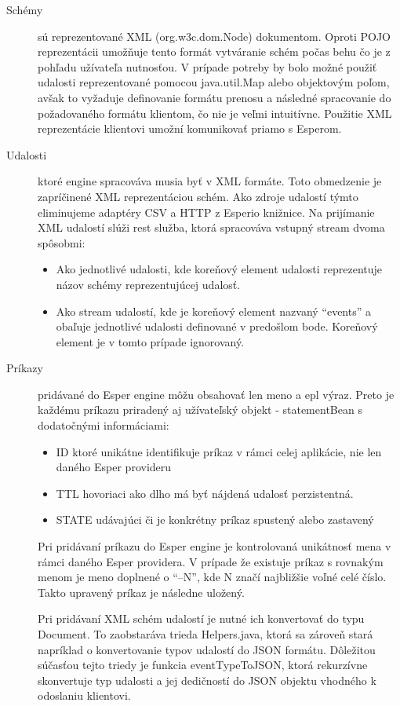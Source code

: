 		\begin{description}
			\item[Schémy] sú reprezentované XML (org.w3c.dom.Node) dokumentom. Oproti POJO reprezentácii umožňuje tento formát vytváranie schém počas behu čo je z pohľadu užívateľa nutnosťou. V prípade potreby by bolo možné použiť udalosti reprezentované pomocou java.util.Map alebo objektovým poľom, avšak to vyžaduje definovanie formátu prenosu a následné spracovanie do požadovaného formátu klientom, čo nie je veľmi intuitívne. Použitie XML reprezentácie klientovi umožní komunikovať priamo s Esperom.
			
			\item[Udalosti] ktoré engine spracováva musia byť v XML formáte. Toto obmedzenie je zapríčinené XML reprezentáciou schém. Ako zdroje udalostí týmto eliminujeme adaptéry CSV a HTTP z Esperio knižnice. Na prijímanie XML udalostí slúži rest služba, ktorá spracováva vstupný stream dvoma spôsobmi:
			\begin{itemize}
				\item Ako jednotlivé udalosti, kde koreňový element udalosti reprezentuje názov schémy reprezentujúcej udalosť.
				\item Ako stream udalostí, kde je koreňový element nazvaný ``events'' a obaľuje jednotlivé udalosti definované v predošlom bode. Koreňový element je v tomto prípade ignorovaný.
			\end{itemize}
			
			\item[Príkazy] pridávané do Esper engine môžu obsahovať len meno a epl výraz. Preto je každému príkazu priradený aj užívateľský objekt - statementBean s dodatočnými informáciami:
			\begin{itemize}
				\item ID ktoré unikátne identifikuje príkaz v rámci celej aplikácie, nie len daného Esper provideru
				\item TTL hovoriaci ako dlho má byť nájdená udalosť perzistentná.
				\item STATE udávajúci či je konkrétny príkaz spustený alebo zastavený
			\end{itemize}
				

			Pri pridávaní príkazu do Esper engine je kontrolovaná unikátnosť mena v rámci daného Esper providera. V prípade že existuje príkaz s rovnakým menom je meno doplnené o ``--N'', kde N značí najbližšie voľné celé číslo. Takto upravený príkaz je následne uložený.
			
			Pri pridávaní XML schém udalostí je nutné ich konvertovať do typu Document. To zaobstaráva trieda Helpers.java, ktorá sa zároveň stará napríklad o konvertovanie typov udalostí do JSON formátu. Dôležitou súčasťou tejto triedy je funkcia eventTypeToJSON, ktorá rekurzívne skonvertuje typ udalosti a jej dedičností do JSON objektu vhodného k odoslaniu klientovi.
			
		\end{description}
		
